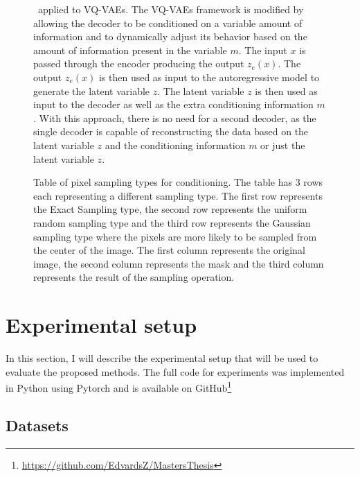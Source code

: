 \begin{figure}[H]
    \centering
    
    \caption[ applied to VQ-VAEs.]%
    {
        \methodTwo\ applied to VQ-VAEs. The VQ-VAEs framework is modified by allowing the decoder to be conditioned on a variable amount of information and to dynamically adjust its behavior based on the amount of information present in the variable $m$. The input $x$ is passed through the encoder producing the output $z_e(x)$. The output $z_e(x)$ is then used as input to the autoregressive model to generate the latent variable $z$. The latent variable $z$ is then used as input to the decoder as well as the extra conditioning information $m$. With this approach, there is no need for a second decoder, as the single decoder is capable of reconstructing the data based on the latent variable $z$ and the conditioning information $m$ or just the latent variable $z$.
    }\label{SCVQVAE1DFigure}
\end{figure}

\begin{figure}
    \centering
    
    \caption[Table of pixel sampling types for conditioning.]%
    {
        Table of pixel sampling types for conditioning. The table has 3 rows each representing a different sampling type. The first row represents the Exact Sampling type, the second row represents the uniform random sampling type and the third row represents the Gaussian sampling type where the pixels are more likely to be sampled from the center of the image. The first column represents the original image, the second column represents the mask and the third column represents the result of the sampling operation.
    }\label{SamplingFigure}
\end{figure}

\section{Experimental setup}

In this section, I will describe the experimental setup that will be used to evaluate the proposed methods. The full code for experiments was implemented in Python using Pytorch and is available on GitHub\footnote{\url{https://github.com/EdvardsZ/MastersThesis}}

\subsection{Datasets}

